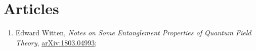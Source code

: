 \documentclass[a4paper,11pt]{article}
\begin{document}
\newpage
\section{Articles}

\vspace{\spaceTwo}


\begin{enumerate}

\item Edward Witten, \emph{Notes on Some Entanglement Properties of Quantum Field Theory}, \href{https://arxiv.org/abs/1803.04993}{arXiv:1803.04993};

\end{enumerate}











\end{document}
